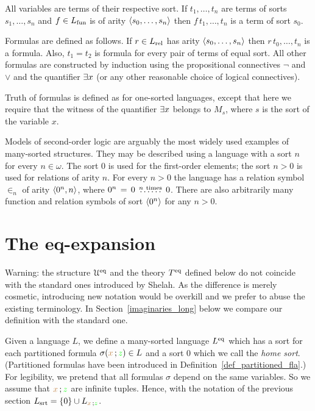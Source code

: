 All variables are terms of their respective sort.
If $t_1,\dots,t_n$ are terms of sorts $s_1,\dots,s_n$ and $f\in L_{\rm fun}$ is of arity $\langle s_0,\dots,s_n\rangle$ then $f\,t_1,\dots,t_n$ is a term of sort $s_0$.


Formulas are defined as follows.
If $r\in L_{\rm rel}$ has arity $\langle s_0,\dots,s_n\rangle$ then $r\,t_0,\dots,t_n$ is a formula.
Also, $t_1=t_2$ is formula for every pair of terms of equal sort.
All other formulas are constructed by induction using the propositional connectives $\neg$ and $\vee$ and the quantifier $\exists x$ (or any other reasonable choice of logical connectives).

Truth of formulas is defined as for one-sorted languages, except that here we require that the witness of the quantifier $\exists x$ belongs to $M_s$, where $s$ is the sort of the variable $x$.

Models of second-order logic are arguably the most widely used examples of many-sorted structures.
They may be described using a language with a sort $n$ for every $n\in\omega$.
The sort $0$ is used for the first-order elements; the sort $n>0$ is used for relations of arity $n$.
For every $n>0$ the language has a relation symbol $\in_n$ of arity $\langle0^n,n\rangle$, where $0^n\,=\, 0\,\stackrel{n\ \rm times}{\dots\dots}\,0$.
%
%
There are also arbitrarily many function and relation symbols of sort $\langle0^n\rangle$ for any $n>0$.

\section{The eq-expansion}\label{immaginari}

\noindent\llap{\textcolor{red}{\Large\warning}\kern1.5ex}Warning: the structure $\EuScript U^{{\rm eq}}$ and the theory $T^{{\rm eq}}$ defined below do not coincide with the standard ones introduced by Shelah.
As the difference is merely cosmetic, introducing new notation would be overkill and we prefer to abuse the existing terminology.
In Section~\ref{imaginaries_long} below we compare our definition with the standard one.

Given a language $L$, we define a many-sorted language \emph{$L^{{{\rm eq}}}$\/} which has a sort for each partitioned formula $\sigma({\color{brown} x}\,;{\color{green} z})\in L$ and a sort \emph{$0$\/} which we call the \emph{home sort}.
(Partitioned formulas have been introduced in Definition~\ref{def_partitioned_fla}.)
For legibility, we pretend that all formulas $\sigma$ depend on the same variables. 
So we assume that ${\color{brown} x}\,;{\color{green} z}$ are infinite tuples.
Hence, with the notation of the previous section $L_{\rm srt}=\{0\}\cup L_{{\color{brown} x}\,;{\color{green} z}}$. 


